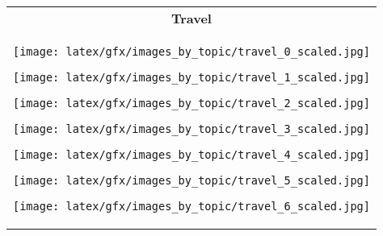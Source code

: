 \begin{table*}[ht]
\begin{tabular}{c}
            \textbf{Travel}  \\ \cmidrule(lr){1-1}
                    \begin{minipage}{0.08\textwidth}
                        \centering
                        \texttt{[image: latex/gfx/images\_by\_topic/travel\_0\_scaled.jpg]}
                    \end{minipage}
                    \hfill
                    \begin{minipage}{0.08\textwidth}
                        \centering
                        \texttt{[image: latex/gfx/images\_by\_topic/travel\_1\_scaled.jpg]}
                    \end{minipage}
                    \hfill
                    \begin{minipage}{0.08\textwidth}
                        \centering
                        \texttt{[image: latex/gfx/images\_by\_topic/travel\_2\_scaled.jpg]}
                    \end{minipage}
                    \hfill
                    \begin{minipage}{0.08\textwidth}
                        \centering
                        \texttt{[image: latex/gfx/images\_by\_topic/travel\_3\_scaled.jpg]}
                    \end{minipage}
                    \hfill
                    \begin{minipage}{0.08\textwidth}
                        \centering
                        \texttt{[image: latex/gfx/images\_by\_topic/travel\_4\_scaled.jpg]}
                    \end{minipage}
                    \hfill
                    \begin{minipage}{0.08\textwidth}
                        \centering
                        \texttt{[image: latex/gfx/images\_by\_topic/travel\_5\_scaled.jpg]}
                    \end{minipage}
                    \hfill
                    \begin{minipage}{0.08\textwidth}
                        \centering
                        \texttt{[image: latex/gfx/images\_by\_topic/travel\_6\_scaled.jpg]}
                    \end{minipage}
                    \hfill
                    \begin{minipage}{0.08\textwidth}

\end{minipage}
\end{tabular}
\end{table*}
